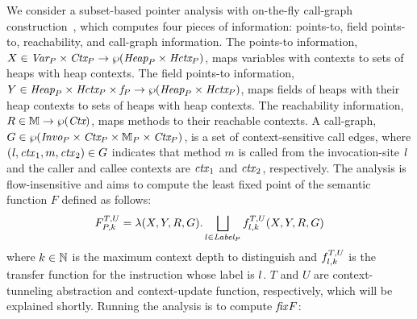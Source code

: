 %
%
%
%
%
We consider a subset-based pointer analysis with on-the-fly call-graph construction~\cite{Smaragdakis2015}, which computes four pieces of
information: points-to, field points-to, reachability, and call-graph
information. The points-to information,
$X\in \text{\it Var}_P \times \text{\it Ctx}_P \to \wp(\text{\it Heap}_P \times \text{\it Hctx}_P)$, maps
variables with contexts to sets of heaps with heap contexts.  
The field points-to information,
$Y \in \text{\it Heap}_P \times \text{\it Hctx}_P \times {\it f}_P \to \wp(\text{\it Heap}_P \times \text{\it Hctx}_P)$, maps
fields of heaps with their heap contexts to sets of heaps with heap contexts.  
The
reachability information, $R \in {\mathbb{M}} \to \wp(\text{\it Ctx})$,
maps methods to their reachable contexts. 
A call-graph,
$G\in \wp(\text{\it Invo}_P \times \text{\it Ctx}_P\times {\mathbb{M}}_P\times \text{\it Ctx}_P)$,
is a set of context-sensitive call edges, where
$({\it l},{\it ctx}_1,m,{\it ctx}_2) \in G$ indicates that method $m$ is
called from the invocation-site ${\it l}$ and the caller and callee
contexts are ${\it ctx}_1$ and ${\it ctx}_2$, respectively. The analysis is
flow-insensitive and aims to compute the least fixed point of the semantic function $F$ defined as follows:
\[
F^{T,U}_{P,k} = \lambda (X, Y, R, G). \bigsqcup_{l \in \text{\it Label}_P}
f^{T, U}_{l, k}(X, Y ,R, G) 
\]
where $k \in \mathbb{N}$ is the maximum context depth to distinguish and  $f^{T, U}_{l, k}$ is the transfer function for the instruction whose label is $l$. $T$ and $U$ are context-tunneling abstraction and context-update function, respectively, which will be explained shortly. Running the analysis is to compute ${\it fix} F$:
